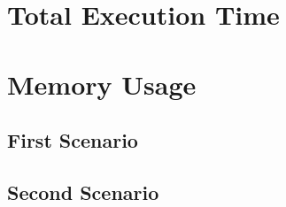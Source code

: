 \section{Total Execution Time}

\section{Memory Usage}
\subsection{First Scenario}
\subsection{Second Scenario}